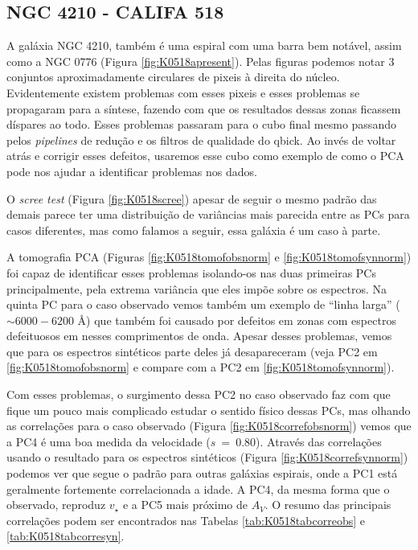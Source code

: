 \subsection{NGC 4210 - CALIFA 518}

A galáxia NGC 4210, também é uma espiral com uma barra bem notável, assim como a NGC 0776 (Figura
\ref{fig:K0518apresent}). Pelas figuras podemos notar 3 conjuntos aproximadamente circulares de pixeis à direita do
núcleo. Evidentemente existem problemas com esses pixeis e esses problemas se propagaram para a síntese, fazendo com que
os resultados dessas zonas ficassem díspares ao todo. Esses problemas passaram para o cubo final mesmo passando pelos
{\em pipelines} de redução e os filtros de qualidade do {\sc qbick}. Ao invés de voltar atrás e corrigir esses defeitos,
usaremos esse cubo como exemplo de como o PCA pode nos ajudar a identificar problemas nos dados.

O {\em scree test} (Figura \ref{fig:K0518scree}) apesar de seguir o mesmo padrão das demais parece ter uma distribuição
de variâncias mais parecida entre as PCs para casos diferentes, mas como falamos a seguir, essa galáxia é um caso à
parte.

A tomografia PCA (Figuras \ref{fig:K0518tomofobsnorm} e \ref{fig:K0518tomofsynnorm}) foi capaz de identificar esses
problemas isolando-os nas duas primeiras PCs principalmente, pela extrema variância que eles impõe sobre os espectros.
Na quinta PC para o caso observado vemos também um exemplo de ``linha larga'' ($\sim6000-6200$ \AA) que também foi
causado por defeitos em zonas com espectros defeituosos em nesses comprimentos de onda. Apesar desses problemas, vemos
que para os espectros sintéticos parte deles já desapareceram (veja PC2 em \ref{fig:K0518tomofobsnorm} e compare com a
PC2 em \ref{fig:K0518tomofsynnorm}).

Com esses problemas, o surgimento dessa PC2 no caso observado faz com que fique um pouco mais complicado estudar o
sentido físico dessas PCs, mas olhando as correlações para o caso observado (Figura \ref{fig:K0518correfobsnorm}) vemos
que a PC4 é uma boa medida da velocidade ($s\ =\ 0.80$). Através das correlações usando o resultado para os espectros
sintéticos (Figura \ref{fig:K0518correfsynnorm}) podemos ver que segue o padrão para outras galáxias espirais, onde a
PC1 está geralmente fortemente correlacionada a idade. A PC4, da mesma forma que o observado, reproduz $v_\star$ e a PC5
mais próximo de $A_V$. O resumo das principais correlações podem ser encontrados nas Tabelas \ref{tab:K0518tabcorreobs}
e \ref{tab:K0518tabcorresyn}.

